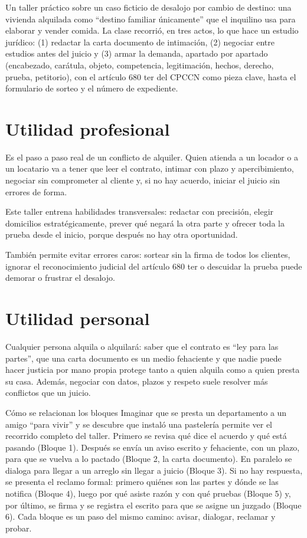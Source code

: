 \documentclass[12pt,oneside]{book}
\begin{document}
Un taller práctico sobre un caso ficticio de desalojo por cambio de destino: una vivienda alquilada como ``destino familiar únicamente'' que el inquilino usa para elaborar y vender comida. La clase recorrió, en tres actos, lo que hace un estudio jurídico: (1) redactar la carta documento de intimación, (2) negociar entre estudios antes del juicio y (3) armar la demanda, apartado por apartado (encabezado, carátula, objeto, competencia, legitimación, hechos, derecho, prueba, petitorio), con el artículo 680 ter del CPCCN como pieza clave, hasta el formulario de sorteo y el número de expediente.

\section*{Utilidad profesional}

Es el paso a paso real de un conflicto de alquiler. Quien atienda a un locador o a un locatario va a tener que leer el contrato, intimar con plazo y apercibimiento, negociar sin comprometer al cliente y, si no hay acuerdo, iniciar el juicio sin errores de forma.

Este taller entrena habilidades transversales: redactar con precisión, elegir domicilios estratégicamente, prever qué negará la otra parte y ofrecer toda la prueba desde el inicio, porque después no hay otra oportunidad.

También permite evitar errores caros: sortear sin la firma de todos los clientes, ignorar el reconocimiento judicial del artículo 680 ter o descuidar la prueba puede demorar o frustrar el desalojo.

\section*{Utilidad personal}

Cualquier persona alquila o alquilará: saber que el contrato es ``ley para las partes'', que una carta documento es un medio fehaciente y que nadie puede hacer justicia por mano propia protege tanto a quien alquila como a quien presta su casa. Además, negociar con datos, plazos y respeto suele resolver más conflictos que un juicio.

\begin{example}{Cómo se relacionan los bloques}
Imaginar que se presta un departamento a un amigo ``para vivir'' y se descubre que instaló una pastelería permite ver el recorrido completo del taller. Primero se revisa qué dice el acuerdo y qué está pasando (Bloque 1). Después se envía un aviso escrito y fehaciente, con un plazo, para que se vuelva a lo pactado (Bloque 2, la carta documento). En paralelo se dialoga para llegar a un arreglo sin llegar a juicio (Bloque 3). Si no hay respuesta, se presenta el reclamo formal: primero quiénes son las partes y dónde se las notifica (Bloque 4), luego por qué asiste razón y con qué pruebas (Bloque 5) y, por último, se firma y se registra el escrito para que se asigne un juzgado (Bloque 6). Cada bloque es un paso del mismo camino: avisar, dialogar, reclamar y probar.
\end{example}
\end{document}
